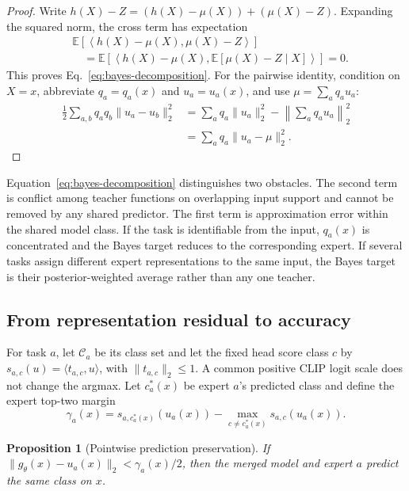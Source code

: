 \documentclass[letterpaper]{article} %
\theoremstyle{plain}
\newtheorem{proposition}[theorem]{Proposition}
\theoremstyle{definition}
\begin{document}
\begin{proof}
Write
$h(X)-Z=(h(X)-\mu(X))+(\mu(X)-Z)$. Expanding the squared norm, the cross term has
expectation
\begin{align*}
&\mathbb E\!\left[
\left\langle h(X)-\mu(X),\mu(X)-Z\right\rangle
\right] \\
&\quad=
\mathbb E\!\left[
\left\langle h(X)-\mu(X),
\mathbb E[\mu(X)-Z\mid X]
\right\rangle
\right]=0.
\end{align*}
This proves Eq.~\eqref{eq:bayes-decomposition}. For the pairwise identity, condition on
$X=x$, abbreviate $q_a=q_a(x)$ and $u_a=u_a(x)$, and use
$\mu=\sum_aq_au_a$:
\begin{align*}
\frac12\sum_{a,b}q_aq_b\|u_a-u_b\|_2^2
&=\sum_aq_a\|u_a\|_2^2-
\left\|\sum_aq_au_a\right\|_2^2 \\
&=\sum_aq_a\|u_a-\mu\|_2^2.
\end{align*}
\end{proof}

Equation~\eqref{eq:bayes-decomposition} distinguishes two obstacles. The second term is
conflict among teacher functions on overlapping input support and cannot be removed by
any shared predictor. The first term is approximation error within the shared model
class. If the task is identifiable from the input, $q_a(x)$ is concentrated and the
Bayes target reduces to the corresponding expert. If several tasks assign different
expert representations to the same input, the Bayes target is their posterior-weighted
average rather than any one teacher.

\subsection{From representation residual to accuracy}
\label{app:accuracy}

For task $a$, let $\mathcal C_a$ be its class set and let the fixed head score class $c$
by $s_{a,c}(u)=\langle t_{a,c},u\rangle$, with
$\|t_{a,c}\|_2\le1$. A common positive CLIP logit scale does not change the argmax. Let
$c_a^*(x)$ be expert $a$'s predicted class and define the expert top-two margin
\begin{equation}
\gamma_a(x)=s_{a,c_a^*(x)}(u_a(x))-
\max_{c\ne c_a^*(x)}s_{a,c}(u_a(x)).
\label{eq:expert-margin}
\end{equation}

\begin{proposition}[Pointwise prediction preservation]
\label{prop:pointwise-margin}
If $\|g_\theta(x)-u_a(x)\|_2<\gamma_a(x)/2$, then the merged model and expert $a$
predict the same class on $x$.
\end{proposition}
\end{document}
